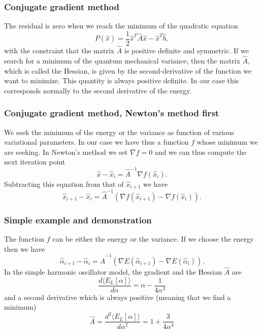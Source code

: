 \documentclass{beamer}
\begin{document}
\begin{frame}
\frametitle{Conjugate gradient method}

\begin{block}{}

The residual is zero when we reach the minimum of the quadratic equation
\begin{equation*}
  P(\hat{x})=\frac{1}{2}\hat{x}^T\hat{A}\hat{x} - \hat{x}^T\hat{b},
\end{equation*}
with the constraint that the matrix $\hat{A}$ is positive definite and symmetric.
If we search for a minimum of the quantum mechanical  variance, then the matrix 
$\hat{A}$, which is called the Hessian, is given by the second-derivative of the function we want to minimize.  This quantity is always positive definite.  In our case this corresponds normally to the second derivative of the energy.  
\end{block}
\end{frame}

\begin{frame}
\frametitle{Conjugate gradient method, Newton's method first}

\begin{block}{}
We seek the minimum of the energy or the variance as function of various variational parameters. 
In our case we have thus a function $f$ whose minimum we are seeking.
In Newton's method we set $\nabla f = 0$ and we can thus compute the next iteration point
\begin{equation*}
\hat{x}-\hat{x}_i=\hat{A}^{-1}\nabla f(\hat{x}_i).
\end{equation*}
Subtracting this equation from that of $\hat{x}_{i+1}$ we have
\begin{equation*}
\hat{x}_{i+1}-\hat{x}_i=\hat{A}^{-1}(\nabla f(\hat{x}_{i+1})-\nabla f(\hat{x}_i)).
\end{equation*}
\end{block}
\end{frame}

\begin{frame}
\frametitle{Simple example and demonstration}

\begin{block}{}
The function $f$ can be either the energy or the variance.  If we choose the energy then we have
\begin{equation*}
\hat{\alpha}_{i+1}-\hat{\alpha}_i=\hat{A}^{-1}(\nabla E(\hat{\alpha}_{i+1})-\nabla E(\hat{\alpha}_i)).
\end{equation*}
In the simple harmonic oscillator model, the gradient and the Hessian $\hat{A}$ are
\begin{equation*}
\frac{d\langle  E_L[\alpha]\rangle}{d\alpha} = \alpha-\frac{1}{4\alpha^3}
\end{equation*}
and a second derivative which is always positive (meaning that we find a minimum)
\begin{equation*}
\hat{A}= \frac{d^2\langle  E_L[\alpha]\rangle}{d\alpha^2} = 1+\frac{3}{4\alpha^4}
\end{equation*}
\end{block}
\end{frame}
\end{document}
